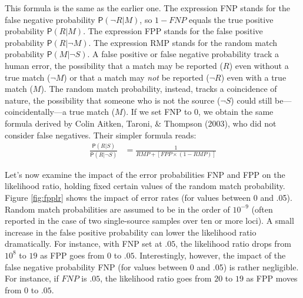 \documentclass[
  10pt,
  dvipsnames,enabledeprecatedfontcommands]{scrartcl}
\newcommand{\n}{\neg}
\newcommand{\pr}[1]{\mathsf{P}(#1)}
\begin{document}
\noindent This formula is the same as the earlier one. The expression
FNP stands for the false negative probability \(\pr{\neg R \vert M}\),
so \(1-FNP\) equals the true positive probability \(\pr{R \vert M}\).
The expression FPP stands for the false positive probability
\(\pr{R \vert \n M}\). The expression RMP stands for the random match
probability \(\pr{M\vert \n S}\). A false positive or false negative
probability track a human error, the possibility that a match may be
reported (\(R\)) even without a true match (\(\neg M\)) or that a match
may \textit{not} be reported (\(\neg R\)) even with a true match
(\(M\)). The random match probability, instead, tracks a coincidence of
nature, the possibility that someone who is not the source (\(\neg S\))
could still be---coincidentally---a true match (\(M\)). If we set FNP to
0, we obtain the same formula derived by Colin Aitken, Taroni, \&
Thompson (2003), who did not consider false negatives. Their simpler
formula reads: \begin{align*}
\frac{\pr{R \vert S}}{\pr{R \vert \neg S}} & = \frac{1}{RMP + [ FPP \times (1-RMP)]}
\end{align*}

Let's now examine the impact of the error probabilities FNP and FPP on
the likelihood ratio, holding fixed certain values of the random match
probability. Figure \ref{fig:fpplr} shows the impact of error rates (for
values between 0 and .05). Random match probabilities are assumed to be
in the order of \(10^{-9}\) (often reported in the case of two
single-source samples over ten or more loci). A small increase in the
false positive probability can lower the likelihood ratio dramatically.
For instance, with FNP set at \(.05\), the likelihood ratio drops from
\(10^8\) to \(19\) as FPP goes from 0 to \(.05\). Interestingly,
however, the impact of the false negative probability FNP (for values
between 0 and .05) is rather negligible. For instance, if \(FNP\) is
\(.05\), the likelihood ratio goes from \(20\) to \(19\) as FPP moves
from \(0\) to \(.05\).
\end{document}
